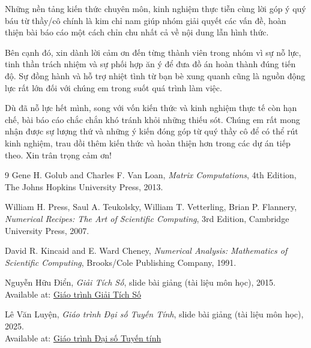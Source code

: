 \documentclass[a4paper,12pt]{report}
\begin{document}
\medskip

Những nền tảng kiến thức chuyên môn, kinh nghiệm thực tiễn cùng lời góp ý quý báu từ thầy/cô chính là kim chỉ nam giúp nhóm giải quyết các vấn đề, hoàn thiện bài báo cáo một cách chỉn chu nhất cả về nội dung lẫn hình thức.

\medskip

Bên cạnh đó, xin dành lời cảm ơn đến từng thành viên trong nhóm vì sự nỗ lực, tinh thần trách nhiệm và sự phối hợp ăn ý để đưa đồ án hoàn thành đúng tiến độ. Sự đồng hành và hỗ trợ nhiệt tình từ bạn bè xung quanh cũng là nguồn động lực rất lớn đối với chúng em trong suốt quá trình làm việc.

\medskip

Dù đã nỗ lực hết mình, song với vốn kiến thức và kinh nghiệm thực tế còn hạn chế, bài báo cáo chắc chắn khó tránh khỏi những thiếu sót. Chúng em rất mong nhận được sự lượng thứ và những ý kiến đóng góp từ quý thầy cô để có thể rút kinh nghiệm, trau dồi thêm kiến thức và hoàn thiện hơn trong các dự án tiếp theo. Xin trân trọng cảm ơn!


\begin{thebibliography}{9}
Gene H. Golub and Charles F. Van Loan,
\textit{Matrix Computations}, 4th Edition,
The Johns Hopkins University Press, 2013.

William H. Press, Saul A. Teukolsky, William T. Vetterling, Brian P. Flannery,
\textit{Numerical Recipes: The Art of Scientific Computing}, 3rd Edition,
Cambridge University Press, 2007.

David R. Kincaid and E. Ward Cheney,
\textit{Numerical Analysis: Mathematics of Scientific Computing},
Brooks/Cole Publishing Company, 1991.

Nguyễn Hữu Điển,
\textit{Giải Tích Số},
slide bài giảng (tài liệu môn học), 2015.\\
Available at: \href{https://drive.google.com/file/d/1edbnnVscdDvR9vdjAVjED8NMYGRVQhG1/view?usp=sharing}{Giáo trình Giải Tích Số}

Lê Văn Luyện,
\textit{Giáo trình Đại số Tuyến Tính},
slide bài giảng (tài liệu môn học), 2025.\\
Available at: \href{https://drive.google.com/drive/folders/1LqRX5OZ7PBZrAPLHV5iihXjvYBq1HkzE?usp=sharing}{Giáo trình Đại số Tuyến tính}

\end{thebibliography}
\end{document}
